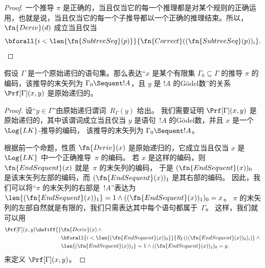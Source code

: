 \documentclass[../../../include/open-logic-section]{subfiles}
\begin{document}
\begin{proof}
  一个推导 $\pi$ 是正确的，当且仅当它的每一个推理都是对某个规则的正确运用，也就是说，当且仅当它的每一个子推导都以一个正确的推理结束。所以，$\fn{Deriv}(d)$ 成立当且仅当
  \[
  \bforall{i<\len{\fn{SubtreeSeq}(p)}}{\fn{Correct}((\fn{SubtreeSeq}(p))_i}.
  \]
\end{proof}


\begin{prop}
假设 $\Gamma$ 是一个原始递归的语句集。那么表达“$x$ 是某个有限集 $\Gamma_0 \subseteq \Gamma$ 的推导 $\pi$ 的编码，该推导的末矢列为 $\Gamma_0 \Sequent !A$，且 $y$ 是 $!A$ 的Gödel数”的关系 $\Prf[\Gamma](x, y)$ 是原始递归的。
\end{prop}

\begin{proof}
设“$y \in \Gamma$”由原始递归谓词~$R_\Gamma(y)$ 给出。
我们需要证明 $\Prf[\Gamma](x, y)$ 是原始递归的，其中该谓词成立当且仅当
$y$ 是语句~$!A$ 的Gödel数，并且 $x$ 是一个 $\Log{LK}$-推导的编码，
该推导的末矢列为 $\Gamma_0 \Sequent !A$。

根据前一个命题，性质 $\fn{Deriv}(x)$ 是原始递归的，它成立当且仅当
$x$ 是 $\Log{LK}$ 中一个正确推导~$\pi$ 的编码。
若 $x$ 是这样的编码，则 $\fn{EndSequent}(x)$ 就是~$\pi$ 的末矢列的编码，
于是 $(\fn{EndSequent}(x))_0$ 是该末矢列左部的编码，而 $(\fn{EndSequent}(x))_1$ 是其右部的编码。
因此，我们可以将“$\pi$ 的末矢列的右部是~$!A$”表达为 $\len{(\fn{EndSequent}(x))_1} = 1 \land ((\fn{EndSequent}(x))_1)_0 =
x$。
$\pi$ 的末矢列的左部自然就是有限的，我们只需表达其中每个语句都属于~$\Gamma$。
这样，我们就可以用 \begin{align*}
\Prf[\Gamma](x, y) \defiff {}&
\fn{Deriv}(x) \land {} \\
& \bforall{i <
  \len{(\fn{EndSequent}(x))_0}}{R_\Gamma(((\fn{EndSequent}(x))_0)_i)} \land {}\\
& \len{(\fn{EndSequent}(x))_1} = 1 \land ((\fn{EndSequent}(x))_1)_0 = y.
\end{align*} 来定义 $\Prf[\Gamma](x, y)$。
\end{proof}
\end{document}
